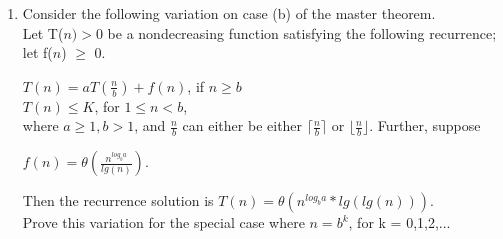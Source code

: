 \documentclass[11pt]{article}
\begin{document}
\begin{enumerate}
\item Consider the following variation on case (b) of the master theorem.\\Let T($n) > 0$ be a nondecreasing function satisfying the following recurrence; let f($n$) $\geq$ 0.

$T(n) = aT(\frac{n}{b}) + f(n)$, if $n \geq b$\\
$T(n) \leq K$, for $1 \leq n < b$,\\
where $a \geq 1, b > 1$, and $\frac{n}{b}$ can either be either $\lceil{\frac{n}{b}}\rceil$ or $\lfloor{\frac{n}{b}}\rfloor$. Further, suppose

$f(n) = \theta(\frac{n^{log_{b}a}}{lg(n)})$.

Then the recurrence solution is $T(n) = \theta(n^{log_{b}a}*lg(lg(n)))$.\\
Prove this variation for the special case where $n=b^{k}$, for k = 0,1,2,...\\


\end{enumerate}
\end{document}

